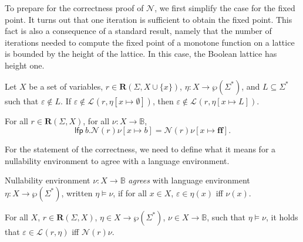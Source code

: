 \documentclass[runningheads, envcountsame, a4paper]{llncs}
\newcommand{\True}{\ensuremath{\mathbf{tt}}}%
\newcommand{\False}{\ensuremath{\mathbf{ff}}}%
\newcommand\Power{\wp}
\newcommand\bool{\mathbb{B}}
\newcommand\LFP{\textsf{lfp}}
\newcommand\Rnull{\mathbf0}
\newcommand\Rempty{\mathbf1}
\newcommand\Lang[1][{}]{\mathcal{L}^{#1}}
\renewcommand\L\Lang
\newcommand\Reg{\mathbf{R}}
\newcommand\Null{\mathcal{N}}
\begin{document}
To prepare for the correctness proof of $\Null$, we first simplify the
case for the fixed point. It turns out that one iteration is sufficient
to obtain the fixed point. This fact is also a consequence of a standard
result, namely that the number of iterations needed to compute the
fixed point of a monotone function on a lattice is bounded by the height
of the lattice. In this case, the Boolean lattice has height one.
\begin{lemma}\label{lemma:epsilon-in-empty-l}
  Let $X$ be a set of variables, $r \in \Reg (\Sigma, X \cup\{x\})$, 
  $\eta : X \to \Power (\Sigma^*)$, and $L\subseteq \Sigma^*$ such
  that $\varepsilon \notin L$.
  If $\varepsilon \notin\Lang (r, { \eta[x \mapsto
  \emptyset]}) $, then $\varepsilon \notin \Lang (r, { \eta[x \mapsto L]})$. 
\end{lemma}
\begin{lemma}\label{lemma:nullability-fixpoint}
  For all $r\in\Reg (\Sigma,X)$, for all $\nu : X\to \bool$,
  $$\LFP\ b.\Null (r)\nu[x \mapsto b] = \Null (r)\nu[x \mapsto \False].$$ 
\end{lemma}

For the statement of the correctness, we need to define what it means
for a nullability environment to agree with a language environment.
\begin{definition}
  Nullability environment $\nu : X \to \bool$ \emph{agrees} with
  language environment $\eta : X \to \Power (\Sigma^*)$, written
  $\eta \models \nu$, if for all $x\in X$, $\varepsilon \in \eta (x)$ iff $\nu (x)$.
\end{definition}

\begin{lemma}[Correctness of $\Null$]\label{lemma:correctness-of-null}
  For all $X$,  $r \in \Reg (\Sigma, X)$, $\eta\in X \to \Power (\Sigma^*)$, $\nu \in X \to \bool$,
  such that $\eta \models \nu$, it holds that 
  $\varepsilon \in \Lang (r, {\eta})$ iff $\Null (r)\nu$.
\end{lemma}

\end{document}
